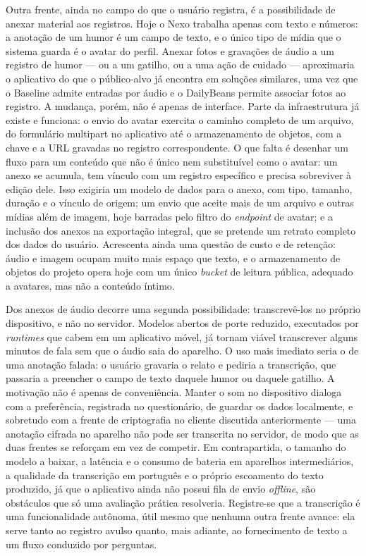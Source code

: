 Outra frente, ainda no campo do que o usuário registra, é a possibilidade de
anexar material aos registros. Hoje o Nexo trabalha apenas com texto e números:
a anotação de um humor é um campo de texto, e o único tipo de mídia que
o sistema guarda é o avatar do perfil. Anexar fotos e gravações de áudio a um
registro de humor --- ou a um gatilho, ou a uma ação de cuidado --- aproximaria
o aplicativo do que o público-alvo já encontra em soluções similares, uma vez
que o Baseline admite entradas por áudio e o DailyBeans permite associar fotos
ao registro. A mudança, porém, não é apenas de interface. Parte da
infraestrutura já existe e funciona: o envio do avatar exercita o caminho
completo de um arquivo, do formulário multipart no aplicativo até
o armazenamento de objetos, com a chave e a URL gravadas no registro
correspondente. O que falta é desenhar um fluxo para um conteúdo que não
é único nem substituível como o avatar: um anexo se acumula, tem vínculo com um
registro específico e precisa sobreviver à edição dele. Isso exigiria um modelo
de dados para o anexo, com tipo, tamanho, duração e o vínculo de origem; um
envio que aceite mais de um arquivo e outras mídias além de imagem, hoje
barradas pelo filtro do \textit{endpoint} de avatar; e a inclusão dos anexos na
exportação integral, que se pretende um retrato completo dos dados do usuário.
Acrescenta ainda uma questão de custo e de retenção: áudio e imagem ocupam
muito mais espaço que texto, e o armazenamento de objetos do projeto opera hoje
com um único \textit{bucket} de leitura pública, adequado a avatares, mas não
a conteúdo íntimo.

Dos anexos de áudio decorre uma segunda possibilidade: transcrevê-los no
próprio dispositivo, e não no servidor. Modelos abertos de porte reduzido,
executados por \textit{runtimes} que cabem em um aplicativo móvel, já tornam
viável transcrever alguns minutos de fala sem que o áudio saia do aparelho.
O uso mais imediato seria o de uma anotação falada: o usuário gravaria o relato
e pediria a transcrição, que passaria a preencher o campo de texto daquele
humor ou daquele gatilho. A motivação não é apenas de conveniência. Manter
o som no dispositivo dialoga com a preferência, registrada no questionário, de
guardar os dados localmente, e sobretudo com a frente de criptografia no
cliente discutida anteriormente --- uma anotação cifrada no aparelho não pode
ser transcrita no servidor, de modo que as duas frentes se reforçam em vez de
competir. Em contrapartida, o tamanho do modelo a baixar, a latência
e o consumo de bateria em aparelhos intermediários, a qualidade da transcrição
em português e o próprio escoamento do texto produzido, já que o aplicativo
ainda não possui fila de envio \textit{offline}, são obstáculos que só uma
avaliação prática resolveria. Registre-se que a transcrição é uma
funcionalidade autônoma, útil mesmo que nenhuma outra frente avance: ela serve
tanto ao registro avulso quanto, mais adiante, ao fornecimento de texto a um
fluxo conduzido por perguntas.

